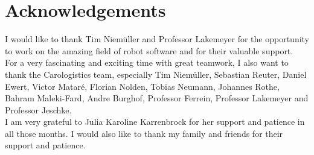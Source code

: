\newpage

\section*{Acknowledgements}

I would like to thank Tim Niem\"{u}ller and Professor Lakemeyer for the opportunity to work on the amazing field of robot software and for their valuable support.\\
For a very fascinating and exciting time with great teamwork, I also want to thank the Carologistics team, especially Tim Niem\"{u}ller, Sebastian Reuter, Daniel Ewert, Victor Matar\'{e}, Florian Nolden, Tobias Neumann, Johannes Rothe, Bahram Maleki-Fard, Andre Burghof, Professor Ferrein, Professor Lakemeyer and Professor Jeschke.\\
I am very grateful to Julia Karoline Karrenbrock for her support and patience in all those months. I would also like to thank my family and friends for their support and patience.
